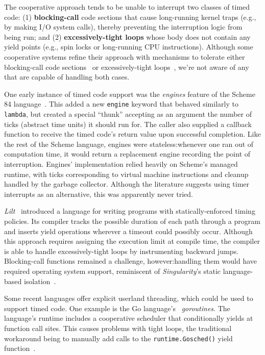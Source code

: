 The cooperative approach tends to be unable to interrupt two classes of timed code:\@
(1) \textbf{blocking-call} code sections that cause
long-running kernel traps (e.g., by making I/O system calls),
thereby preventing the interruption logic from being run; and (2)
\textbf{excessively-tight loops} whose body does not contain any yield points (e.g.,
spin locks or long-running CPU instructions).
Although some cooperative systems refine their approach with mechanisms
to tolerate either blocking-call code sections~\cite{www-golang} or excessively-tight
loops~\cite{vanderwaart:cmucs2006}, we're not aware of any that are capable of
handling both
cases.

One early instance of timed code support was the \textit{engines} feature of
the Scheme 84 language~\cite{haynes:iucs1984}.  This added a new \texttt{engine}
keyword that behaved similarly to \texttt{lambda}, but created a special ``thunk''
accepting as an argument the number of ticks (abstract time units) it should run for.
The caller also supplied a callback function to receive the
timed code's return value upon successful completion.  Like the rest of the
Scheme language, engines were stateless:\@ whenever one ran out of computation time,
it would return a replacement engine recording the point of interruption.  Engines'
implementation relied heavily on Scheme's managed runtime, with ticks
corresponding to virtual machine instructions and cleanup handled by the garbage
collector.  Although the literature suggests using timer interrupts as an
alternative, this was apparently never tried.

\textit{Lilt}~\cite{vanderwaart:cmucs2006} introduced a language for writing
programs with statically-enforced timing policies.
Its compiler tracks the possible duration of each path through a program and
inserts yield operations wherever a timeout could possibly occur.  Although this
approach requires assigning the execution limit at compile time, the compiler is able
to handle excessively-tight loops by instrumenting backward jumps.
Blocking-call functions remained a challenge, however:\@ handling them would have
required
operating system support, reminiscent of \textit{Singularity}'s static language-based
isolation~\cite{hunt:msr2005}.

Some recent languages offer explicit userland threading, which could be used to
support timed
code.  One example is the Go language's~\cite{www-golang} \textit{goroutines}.
The language's runtime includes a cooperative scheduler that conditionally yields
at function call sites.  This causes problems with tight loops, the
traditional workaround being to manually add calls to the \texttt{runtime.Gosched()}
yield function~\cite{www-golang-tightloop}.

